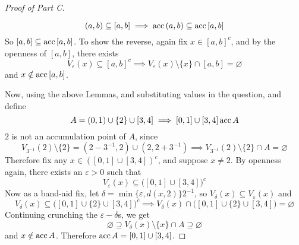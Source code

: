 \documentclass[../main.tex]{subfiles}
\begin{document}
\begin{proof}[Proof of Part C]
\begin{enumerate}
        \[(a,b)\subseteq[a,b]\implies\operatorname{acc}{(a,b)}\subseteq\operatorname{acc}{[a,b]}\]
        So $[a,b]\subseteq\operatorname{acc}{[a,b]}$. To show the reverse, again fix $x\in [a,b]^c$, and by the openness of $[a,b]$, there exists \[V_\varepsilon(x)\subseteq [a,b]^c\implies V_\varepsilon(x)\setminus\{x\}\cap[a,b]=\varnothing\]
        and $x\notin \operatorname{acc}{[a,b]}$.
    \end{enumerate}
    Now, using the above Lemmas, and substituting values in the question, and define
    \[A = (0,1)\cup\{2\}\cup[3,4]\implies[0,1]\cup[3,4]\operatorname{acc}{A}\]
    $2$ is not an accumulation point of $A$, since 
    \[V_{3^{-1}}(2)\setminus\{2\}=(2-3^{-1},2)\cup(2,2+3^{-1})\implies V_{3^{-1}}(2)\setminus\{2\}\cap A = \varnothing\] Therefore fix any $x\in ([0,1]\cup[3,4])^c$, and suppose $x\neq 2$. By openness again, there exists an $\varepsilon>0$ such that
    \[V_\varepsilon(x)\subseteq \biggl([0,1]\cup[3,4]\biggr)^c\]
    Now as a band-aid fix, let $\delta = \min\{\varepsilon,d(x,2)\}2^{-1}$, so $V_\delta(x)\subseteq V_\varepsilon(x)$ and
    \[V_\delta(x)\subseteq \biggl([0,1]\cup\{2\}\cup[3,4]\biggr)^c\implies V_\delta(x)\cap\biggl([0,1]\cup\{2\}\cup[3,4]\biggr)=\varnothing\]
    Continuing crunching the $\varepsilon-\delta$s, we get
    \[\varnothing\supseteq V_\delta(x)\setminus\{x\}\cap A\supseteq \varnothing\]
    and $x\notin \operatorname{acc}{A}$. Therefore $\operatorname{acc}{A}=[0,1]\cup[3,4]$.
\end{proof}
\end{document}
